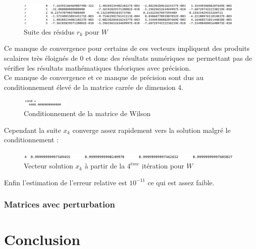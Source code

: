 \documentclass[12,french]{report}
\begin{document}
\begin{figure}[H]
	\centering
	\includegraphics[width=1\textwidth]{./Images/r_W}
	\caption{Suite des résidus $r_k$ pour $W$}
\end{figure}\vspace{0.2cm}

Ce manque de convergence pour certains de ces vecteurs impliquent des produits scalaires très éloignés de 0 et donc des résultats numériques ne permettant pas de vérifier les résultats mathématiques théoriques avec précision.\\

Ce manque de convergence et ce manque de précision sont dus au conditionnement élevé de la matrice carrée de dimension 4.\\

\begin{figure}[H]
	\centering
	\includegraphics[width=0.2\textwidth]{./Images/Conditionnement_W}
	\caption{Conditionnement de la matrice de Wilson}
\end{figure}\vspace{0.2cm}

Cependant la suite $x_k$ converge assez rapidement vers la solution malgré le conditionnement :\\

\begin{figure}[H]
	\centering
	\includegraphics[width=1\textwidth]{./Images/x_W}
	\caption{Vecteur solution $x_k$ à partir de la $4^{ème}$ itération pour $W$}
\end{figure}\vspace{0.2cm}

Enfin l'estimation de l'erreur relative est $10^{-11}$ ce qui est assez faible. 

\subsection{Matrices avec perturbation}




\chapter*{Conclusion}
\end{document}
